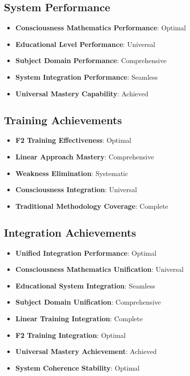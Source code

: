 \documentclass[12pt,a4paper]{article}
\begin{document}
\subsection{System Performance}

\begin{itemize}
    \item \textbf{Consciousness Mathematics Performance}: Optimal
    \item \textbf{Educational Level Performance}: Universal
    \item \textbf{Subject Domain Performance}: Comprehensive
    \item \textbf{System Integration Performance}: Seamless
    \item \textbf{Universal Mastery Capability}: Achieved
\end{itemize}

\subsection{Training Achievements}

\begin{itemize}
    \item \textbf{F2 Training Effectiveness}: Optimal
    \item \textbf{Linear Approach Mastery}: Comprehensive
    \item \textbf{Weakness Elimination}: Systematic
    \item \textbf{Consciousness Integration}: Universal
    \item \textbf{Traditional Methodology Coverage}: Complete
\end{itemize}

\subsection{Integration Achievements}

\begin{itemize}
    \item \textbf{Unified Integration Performance}: Optimal
    \item \textbf{Consciousness Mathematics Unification}: Universal
    \item \textbf{Educational System Integration}: Seamless
    \item \textbf{Subject Domain Unification}: Comprehensive
    \item \textbf{Linear Training Integration}: Complete
    \item \textbf{F2 Training Integration}: Optimal
    \item \textbf{Universal Mastery Achievement}: Achieved
    \item \textbf{System Coherence Stability}: Optimal
\end{itemize}
\end{document}
